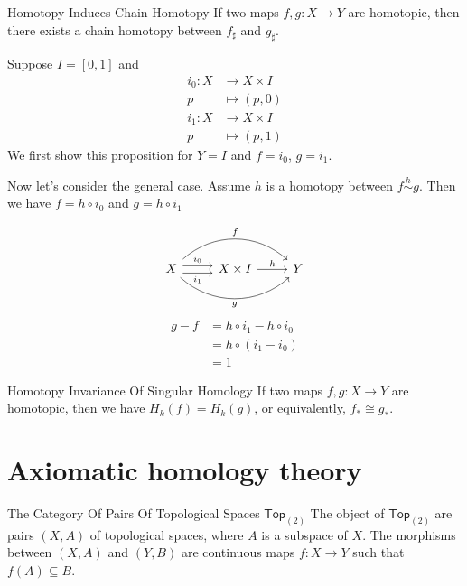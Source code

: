 \documentclass{report}
\begin{document}
\begin{proposition}{Homotopy Induces Chain Homotopy}{}
	If two maps $f,g :X\to Y$ are homotopic, then there exists a chain homotopy between $f_\sharp$ and $g_\sharp$.
\end{proposition}

\begin{prf}
	Suppose $I=[0,1]$ and
	\begin{align*}
		i_0: X &\longrightarrow X\times I\\
		p&\longmapsto (p,0)
	\end{align*}
	\begin{align*}
		i_1: X &\longrightarrow X\times I\\
		p&\longmapsto (p,1)
	\end{align*}
	We first show this proposition for $Y=I$ and $f=i_0$, $g=i_1$. 
	
	
	Now let's consider the general case. Assume $h$ is a homotopy between $f\overset{h}{\sim} g$. Then we have $f=h\circ i_0$ and $g=h\circ i_1$
	
	\begin{equation*}
		\begin{tikzcd}[ampersand replacement=\&]		
			X \arrow[r, shift left=1.2, "i_0"]\arrow[r,shift right=1.2,"i_1"']  \arrow[rr, bend left=42, "f"{ above}] \arrow[rr, bend right=42, "g"{below}]
			\& X\times I \arrow[r, "h"] \& Y
		\end{tikzcd}			
	\end{equation*}
	\[
	\begin{aligned}
		g-f &= h\circ i_1 - h\circ i_0\\
		&= h\circ (i_1-i_0)\\
		&= 1
	\end{aligned}
	\]
\end{prf}


\begin{proposition}{Homotopy Invariance Of Singular Homology}{}
	If two maps $f,g :X\to Y$ are homotopic, then we have $H_k(f)=H_k(g)$, or equivalently, $f_*\cong g_*$.
\end{proposition}


\section{Axiomatic homology theory}
\begin{definition}{The Category Of Pairs Of Topological Spaces $\mathsf{Top}_{(2)}$}{}
	The object of $\mathsf{Top}_{(2)}$ are pairs $(X, A)$ of topological spaces, where $A$ is a subspace of $X$. The morphisms between $(X, A)$ and $(Y, B)$ are continuous maps $f:X\to Y$ such that $f(A)\subseteq B$.
\end{definition}
\end{document}
